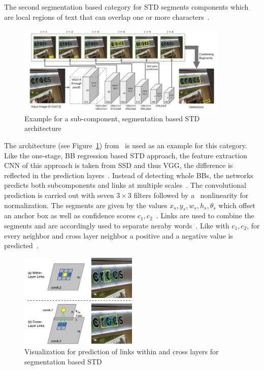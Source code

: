 The second segmentation based category for \ac{STD} segments components which are local regions of
text that can overlap one or more characters~\citep{long_scene_2021}.
\begin{figure}[ht]
    \centering
    \includegraphics[width=0.9\textwidth]{img/STD-seg-based-architecture-Shi-Detecting-2017.png}
    \caption[Sub-component, segmentation based STD architecture]{%
        Example for a sub-component, segmentation based STD
        architecture~\citep{shi_detecting_2017}\label{fig:STD-segbased-component-architecture}
    }
\end{figure}
The architecture (see Figure~\ref{fig:STD-segbased-component-architecture})
from~\cite{shi_detecting_2017} is used as an example for this category.
Like the one-stage, \ac{BB} regression based \ac{STD} approach, the feature extraction \ac{CNN} of
this approach is taken from \ac{SSD} and thus VGG, the difference is reflected in the prediction
layers~\citep{shi_detecting_2017,liu_ssd_2016,simonyan_very_2015}.
Instead of detecting whole \acp{BB}, the networks predicts both subcomponents and links at multiple
scales~\citep{shi_detecting_2017}.
The convolutional prediction is carried out with seven $3\times3$ filters followed by a \sfmx\
nonlinearity for normalization.
The segments are given by the values $x_s,y_s,w_s,h_s,\theta_s$ which offset an anchor box as well
as confidence scores $c_1,c_2$~\citep{shi_detecting_2017}.
Links are used to combine the segments and are accordingly used to separate neraby
words~\citep{shi_detecting_2017}.
Like with $c_1,c_2$, for every neighbor and cross layer neighbor a positive and a negative value
is predicted~\citep{shi_detecting_2017}.
\begin{figure}[ht]
    \centering
    \includegraphics[width=0.5\textwidth]{img/STD-seg-based-links-Shi-Detecting-2017.png}
    \caption[Predicting links for segmentation based STD]{%
        Visualization for prediction of links within and cross layers for segmentation based
        STD~\citep{shi_detecting_2017}\label{fig:STD-segbased-component-links}
    }
\end{figure}
